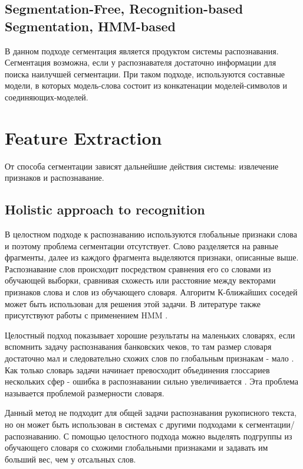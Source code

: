 \subsection{Segmentation-Free, Recognition-based Segmentation, HMM-based} \label{subsect5_1_2}

В данном подходе сегментация является продуктом системы распознавания. Сегментация возможна, если у распознавателя достаточно информации для поиска наилучшей сегментации. При таком подходе, используются составные модели, в которых модель-слова состоит из конкатенации моделей-символов и соединяющих-моделей. 


\section{Feature Extraction} \label{sect5_2}

\cite{Tokas2012}

От способа сегментации зависят дальнейшие действия системы: извлечение признаков и распознавание.


\subsection{Holistic approach to recognition} \label{subsect5_2_1}

В целостном подходе к распознаванию используются глобальные признаки слова и поэтому проблема сегментации отсутствует. Слово разделяется на равные фрагменты, далее из каждого фрагмента выделяются признаки, описанные выше. Распознавание слов происходит посредством сравнения его со словами из обучающей выборки, сравнивая схожесть или расстояние между векторами признаков слова и слов из обучающего словаря. Алгоритм К-ближайших соседей может быть использован для решения этой задачи. В литературе также присутствуют работы с применением HMM \cite{lavrenko2004holistic}.

Целостный подход показывает хорошие результаты на маленьких словарях, если вспомнить задачу распознавания банковских чеков, то там размер словаря достаточно мал и следовательно схожих слов по глобальным признакам - мало \cite{guillevic1995unconstrained} . Как только словарь задачи начинает превосходит объединения глоссариев нескольких сфер - ошибка в распознавании сильно увеличивается \cite{rehman2012off}. Эта проблема называется проблемой размерности словаря.

Данный метод не подходит для общей задачи распознавания рукописного текста, но он может быть использован в системах с другими подходами к сегментации/распознаванию. С помощью целостного подхода можно выделять подгруппы из обучающего словаря со схожими глобальными признаками и задавать им больший вес, чем у отсальных слов.


